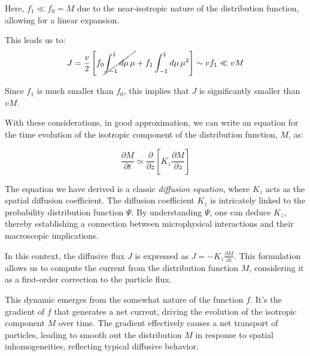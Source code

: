 Here, \( f_1 \ll f_0 = M \) due to the near-isotropic nature of the distribution function, allowing for a linear expansion.

This leads us to:
%
\begin{equation}
J = \frac{v}{2} \left[ f_0 \cancel{\int_{-1}^1 d\mu \, \mu} + f_1 \int_{-1}^1 d\mu \, \mu^2 \right] \sim v f_1 \ll v M
\end{equation}

Since \( f_1 \) is much smaller than \( f_0 \), this implies that \( J \) is significantly smaller than \( vM \).

With these considerations, in good approximation, we can write an equation for the time evolution of the isotropic component of the distribution function, \( M \), as:
%
\begin{remark}
\begin{equation}
\frac{\partial M}{\partial t} \simeq \frac{\partial}{\partial z}\left[K_z \frac{\partial M}{\partial z}  \right]
\end{equation}
\end{remark}

The equation we have derived is a classic \emph{diffusion equation}, where \( K_z \) acts as the spatial diffusion coefficient. The diffusion coefficient \( K_z \) is intricately linked to the probability distribution function \( \Psi \). By understanding \( \Psi \), one can deduce \( K_z \), thereby establishing a connection between microphysical interactions and their macroscopic implications.

In this context, the diffusive flux \( J \) is expressed as \( J = -K_z \frac{\partial M}{\partial z} \). This formulation allows us to compute the current from the distribution function \( M \), considering it as a first-order correction to the particle flux. 

This dynamic emerges from the somewhat nature of the function \( f \). It's the gradient of \( f \) that generates a net current, driving the evolution of the isotropic component \( M \) over time. The gradient effectively causes a net transport of particles, leading to smooth out the distribution \( M \) in response to spatial inhomogeneities, reflecting typical diffusive behavior. 



